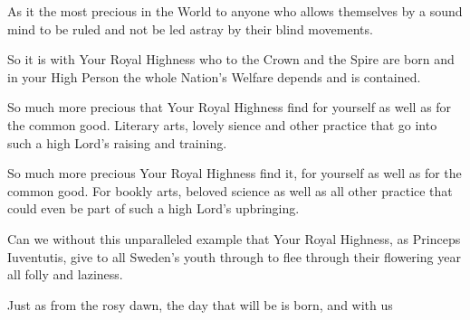 
\newpage





As it the most precious in the World to anyone who allows themselves by a
sound mind to be ruled and not be led astray by their blind
movements. 

So it is with Your Royal Highness who to the Crown and the
Spire are born and in your High Person the whole Nation's Welfare
depends and is contained. 

So much more precious that Your Royal
Highness find for yourself as well as for the common good. Literary
arts, lovely sience and other practice that go into such a high Lord's 
raising and training. 

So much more precious Your Royal Highness find
it,  for yourself as well as for the common good. For bookly arts,
beloved science as well as all other practice that could even be part of
such a high Lord's upbringing.

Can we without this unparalleled example that Your Royal Highness, as
Princeps Iuventutis, give to all Sweden's youth through to flee
through their flowering year all folly and laziness. 

Just as from the rosy dawn, the day that will be is born, and with us 